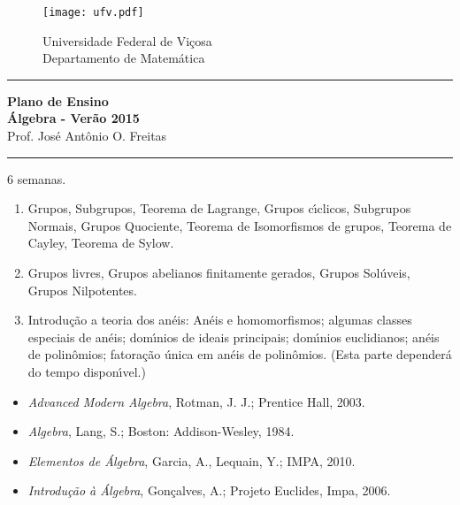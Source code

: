 \documentclass[12pt]{article}
\begin{document}
\pagestyle{empty}

\begin{figure}[h]
    \begin{minipage}[c]{2cm}
    \texttt{[image: ufv.pdf]}
    \end{minipage}%
    \hspace{0pt}
    \begin{minipage}[c]{4in}
    {Universidade Federal de Vi\c{c}osa} \\
    {Departamento de Matem{\'a}tica}
    \end{minipage}
\end{figure}
\vspace{-0.2cm}
\hrule

\begin{center}
{\large\bf Plano de Ensino} \\
{\large\bf \'Algebra - Ver\~ao 2015}\\
Prof. Jos{\'e} Ant{\^o}nio O. Freitas
\end{center}
\hrule
\vspace{0.25cm}
 6 semanas.
\begin{enumerate}[label=({\arabic*})]
\item Grupos, Subgrupos, Teorema de Lagrange, Grupos c{\'\i}clicos, Subgrupos Normais, Grupos Quociente, Teorema de Isomorfismos de grupos, Teorema de Cayley, Teorema de Sylow.

\item Grupos livres, Grupos abelianos finitamente gerados, Grupos Sol\'uveis, Grupos Nilpotentes.

\item Introdu\c{c}\~ao a teoria dos an\'eis: An\'eis e homomorfismos; algumas classes especiais de an\'eis; dom{\'\i}nios de ideais principais; dom{\'\i}nios euclidianos; an\'eis de polin\^omios; fatora\c{c}\~ao \'unica em an\'eis de polin\^omios. (Esta parte depender\'a do tempo dispon{\'\i}vel.)

\end{enumerate}

\begin{itemize}
\item {\it Advanced Modern Algebra}, Rotman, J. J.; Prentice Hall, 2003.
\item {\it Algebra}, Lang, S.; Boston: Addison-Wesley, 1984.
\item {\it Elementos de \'Algebra}, Garcia, A., Lequain, Y.; IMPA, 2010.
\item {\it Introdu\c{c}\~ao \`a \'Algebra}, Gon\c{c}alves, A.; Projeto Euclides, Impa, 2006.
\end{itemize}
\end{document}
